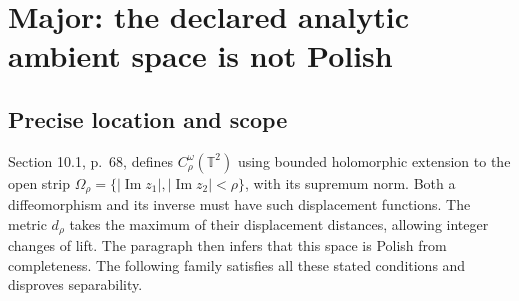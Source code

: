 \documentclass[10pt]{article}
\begin{document}
\section*{Major: the declared analytic ambient space is not Polish}
\subsection*{Precise location and scope}
Section 10.1, p. 68, defines \(C^\omega_\rho(\mathbb T^2)\) using bounded holomorphic extension to the open strip \(\Omega_\rho=\{|\operatorname{Im}z_1|,|\operatorname{Im}z_2|<\rho\}\), with its supremum norm. Both a diffeomorphism and its inverse must have such displacement functions. The metric \(d_\rho\) takes the maximum of their displacement distances, allowing integer changes of lift. The paragraph then infers that this space is Polish from completeness. The following family satisfies all these stated conditions and disproves separability.\par
\end{document}
